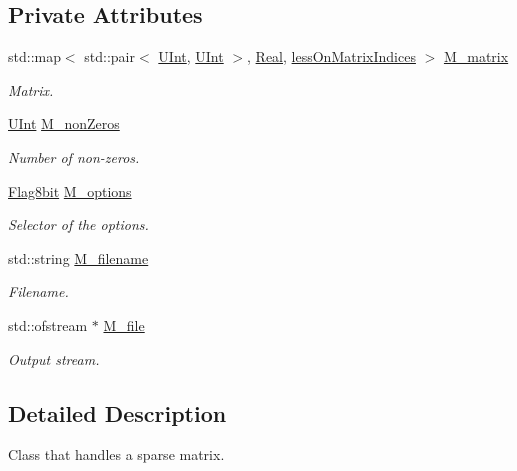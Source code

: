 \subsection*{Private Attributes}
\begin{DoxyCompactItemize}
\item 
std\+::map$<$ std\+::pair$<$ \hyperlink{namespaceFVCode3D_a4bf7e328c75d0fd504050d040ebe9eda}{U\+Int}, \hyperlink{namespaceFVCode3D_a4bf7e328c75d0fd504050d040ebe9eda}{U\+Int} $>$, \hyperlink{namespaceFVCode3D_a40c1f5588a248569d80aa5f867080e83}{Real}, \hyperlink{classFVCode3D_1_1lessOnMatrixIndices}{less\+On\+Matrix\+Indices} $>$ \hyperlink{classFVCode3D_1_1SparseMatrix_a129734d57bfde842f4b90dcb2e8d85e3}{M\+\_\+matrix}
\begin{DoxyCompactList}\small\item\em Matrix. \end{DoxyCompactList}\item 
\hyperlink{namespaceFVCode3D_a4bf7e328c75d0fd504050d040ebe9eda}{U\+Int} \hyperlink{classFVCode3D_1_1SparseMatrix_a4c0c92274503986d2f529a39d50c2efd}{M\+\_\+non\+Zeros}
\begin{DoxyCompactList}\small\item\em Number of non-\/zeros. \end{DoxyCompactList}\item 
\hyperlink{namespaceFVCode3D_a4eac36ed1d93d886ecdcf46c6386b415}{Flag8bit} \hyperlink{classFVCode3D_1_1SparseMatrix_ae83070ee319a49c35bf64bc0af03868f}{M\+\_\+options}
\begin{DoxyCompactList}\small\item\em Selector of the options. \end{DoxyCompactList}\item 
std\+::string \hyperlink{classFVCode3D_1_1SparseMatrix_ab1c614856c8b31a81368163619fc7ba6}{M\+\_\+filename}
\begin{DoxyCompactList}\small\item\em Filename. \end{DoxyCompactList}\item 
std\+::ofstream $\ast$ \hyperlink{classFVCode3D_1_1SparseMatrix_a535d7125855e754fda8ca78895c475e2}{M\+\_\+file}
\begin{DoxyCompactList}\small\item\em Output stream. \end{DoxyCompactList}\end{DoxyCompactItemize}


\subsection{Detailed Description}
Class that handles a sparse matrix. 

